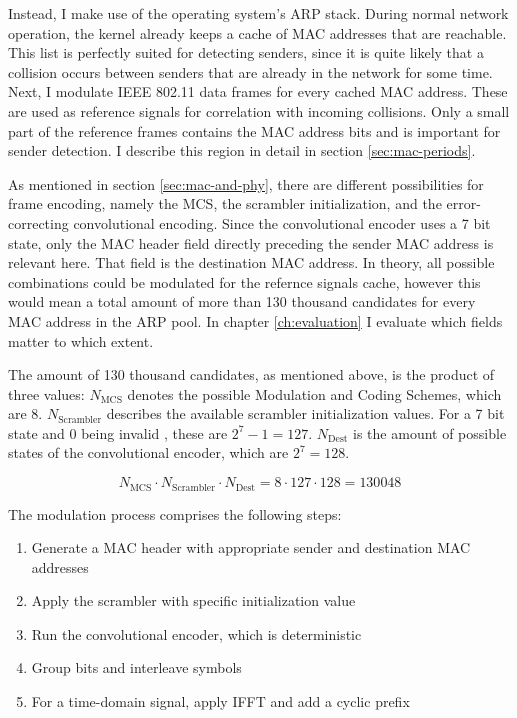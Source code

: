 Instead, I make use of the operating system's \gls{ARP} stack. During normal network operation, the kernel already keeps a cache of \gls{MAC} addresses that are reachable. This list is perfectly suited for detecting senders, since it is quite likely that a collision occurs between senders that are already in the network for some time.\\

Next, I modulate IEEE 802.11 data frames for every cached \gls{MAC} address. These are used as reference signals for correlation with incoming collisions. Only a small part of the reference frames contains the \gls{MAC} address bits and is important for sender detection. I describe this region in detail in section \ref{sec:mac-periods}.

As mentioned in section \ref{sec:mac-and-phy}, there are different possibilities for frame encoding, namely the \gls{MCS}, the scrambler initialization, and the error-correcting convolutional encoding. Since the convolutional encoder uses a 7 bit state, only the \gls{MAC} header field directly preceding the sender \gls{MAC} address is relevant here. That field is the destination \gls{MAC} address. In theory, all possible combinations could be modulated for the refernce signals cache, however this would mean a total amount of  more than 130 thousand candidates for every \gls{MAC} address in the ARP pool. In chapter \ref{ch:evaluation} I evaluate which fields matter to which extent.

The amount of 130 thousand candidates, as mentioned above, is the product of three values: $ N_{\text{MCS}} $ denotes the possible Modulation and Coding Schemes, which are 8. $ N_{\text{Scrambler}} $ describes the available scrambler initialization values. For a 7 bit state and 0 being invalid \cite{ieee2012}, these are $ 2^7 - 1 = 127 $. $ N_{\text{Dest}} $ is the amount of possible states of the convolutional encoder, which are $ 2^7 = 128 $.

$$ N_{\text{MCS}} \cdot N_{\text{Scrambler}} \cdot N_{\text{Dest}} = 8 \cdot 127 \cdot 128 = 130 048 $$\vspace{0cm}

The modulation process comprises the following steps:

\begin{enumerate}
	\item Generate a \gls{MAC} header with appropriate sender and destination \gls{MAC} addresses
	\item Apply the scrambler with specific initialization value
	\item Run the convolutional encoder, which is deterministic
	\item Group bits and interleave symbols
	\item For a time-domain signal, apply \gls{IFFT} and add a cyclic prefix
\end{enumerate}

